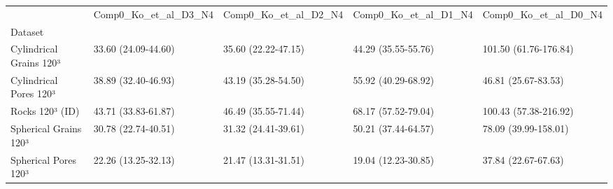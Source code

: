 \begin{tabular}{lllll}
\toprule
 & Comp0_Ko_et_al_D3_N4 & Comp0_Ko_et_al_D2_N4 & Comp0_Ko_et_al_D1_N4 & Comp0_Ko_et_al_D0_N4 \\
Dataset &  &  &  &  \\
\midrule
Cylindrical Grains 120³ & 33.60 (24.09-44.60) & 35.60 (22.22-47.15) & 44.29 (35.55-55.76) & 101.50 (61.76-176.84) \\
Cylindrical Pores 120³ & 38.89 (32.40-46.93) & 43.19 (35.28-54.50) & 55.92 (40.29-68.92) & 46.81 (25.67-83.53) \\
Rocks 120³ (ID) & 43.71 (33.83-61.87) & 46.49 (35.55-71.44) & 68.17 (57.52-79.04) & 100.43 (57.38-216.92) \\
Spherical Grains 120³ & 30.78 (22.74-40.51) & 31.32 (24.41-39.61) & 50.21 (37.44-64.57) & 78.09 (39.99-158.01) \\
Spherical Pores 120³ & 22.26 (13.25-32.13) & 21.47 (13.31-31.51) & 19.04 (12.23-30.85) & 37.84 (22.67-67.63) \\
\bottomrule
\end{tabular}
